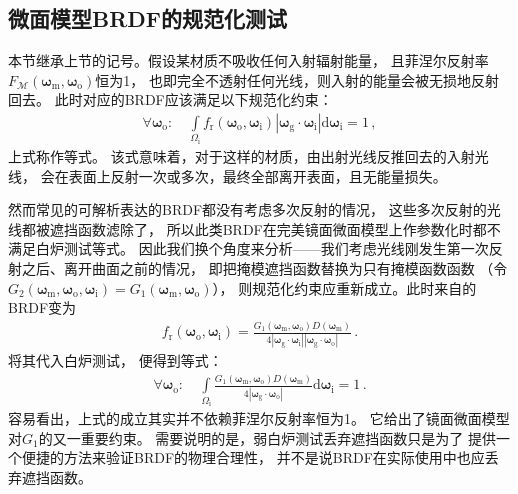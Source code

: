 \subsection{微面模型BRDF的规范化测试}\label{sub:微面模型BRDF的规范化测试}
本节继承上节的记号。假设某材质不吸收任何入射辐射能量，
且菲涅尔反射率$F_{\mathcal{M}}({\bm\omega}_{\mathrm{m}},{\bm\omega}_{\mathrm{o}})$恒为1，
也即完全不透射任何光线，则入射的能量会被无损地反射回去。
此时对应的BRDF应该满足以下规范化约束：
\begin{align}\label{eq:08ex-01-WhiteFurnaceTest}
    \forall {\bm\omega}_{\mathrm{o}}: \quad\int\limits_{{\varOmega}_{\mathrm{i}}}
    f_{\mathrm{r}}({\bm\omega}_{\mathrm{o}},{\bm\omega}_{\mathrm{i}})
    |{\bm\omega}_{\mathrm{g}}\cdot{\bm\omega}_{\mathrm{i}}|\mathrm{d}{\bm\omega}_{\mathrm{i}}=1\, ,
\end{align}
上式称作等式。
该式意味着，对于这样的材质，由出射光线反推回去的入射光线，
会在表面上反射一次或多次，最终全部离开表面，且无能量损失。

然而常见的可解析表达的BRDF都没有考虑多次反射的情况，
这些多次反射的光线都被遮挡函数滤除了，
所以此类BRDF在完美镜面微面模型上作参数化时都不满足白炉测试等式。
因此我们换个角度来分析——我们考虑光线刚发生第一次反射之后、离开曲面之前的情况，
即把掩模遮挡函数替换为只有掩模函数函数
（令$G_2({\bm\omega}_{\mathrm{m}},{\bm\omega}_{\mathrm{o}},{\bm\omega}_{\mathrm{i}})
    =G_1({\bm\omega}_{\mathrm{m}},{\bm\omega}_{\mathrm{o}})$），
则规范化约束应重新成立。此时来自的BRDF变为
\begin{align}
    f_{\mathrm{r}}({\bm\omega}_{\mathrm{o}},{\bm\omega}_{\mathrm{i}})
    =\frac{G_1({\bm\omega}_{\mathrm{m}},{\bm\omega}_{\mathrm{o}})D({\bm\omega}_{\mathrm{m}})}
    {4|{\bm\omega}_{\mathrm{g}}\cdot{\bm\omega}_{\mathrm{i}}||{\bm\omega}_{\mathrm{g}}\cdot{\bm\omega}_{\mathrm{o}}|}\, .
\end{align}
将其代入白炉测试，
便得到等式：
\begin{align}\label{eq:08ex01-WeakWhiteFurnaceTest}
    \forall {\bm\omega}_{\mathrm{o}}: \quad\int\limits_{{\varOmega}_{\mathrm{i}}}
    \frac{G_1({\bm\omega}_{\mathrm{m}},{\bm\omega}_{\mathrm{o}})D({\bm\omega}_{\mathrm{m}})}
    {4|{\bm\omega}_{\mathrm{g}}\cdot{\bm\omega}_{\mathrm{o}}|}\mathrm{d}{\bm\omega}_{\mathrm{i}}=1\, .
\end{align}
容易看出，上式的成立其实并不依赖菲涅尔反射率恒为1。
它给出了镜面微面模型对$G_1$的又一重要约束。
需要说明的是，弱白炉测试丢弃遮挡函数只是为了
提供一个便捷的方法来验证BRDF的物理合理性，
并不是说BRDF在实际使用中也应丢弃遮挡函数。


